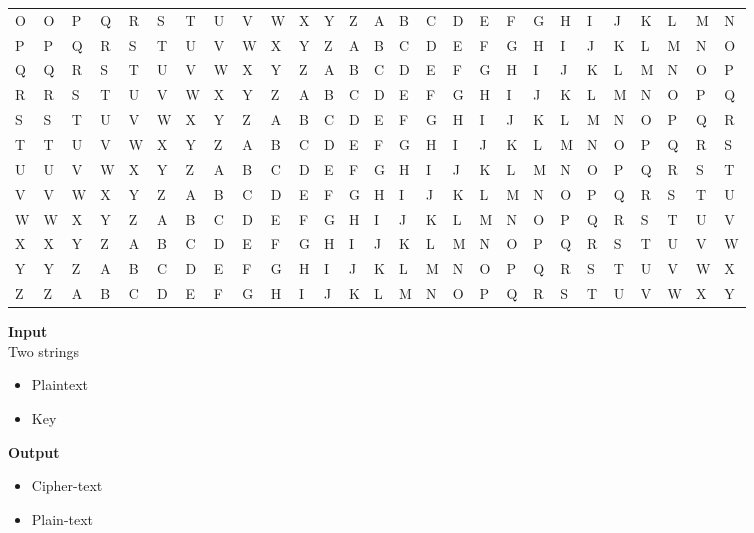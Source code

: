 \documentclass{article}
\begin{document}
\begin{table}[ht]
\begin{adjustbox}{width=1\textwidth}
\begin{tabular}{|l|llllllllllllllllllllllllll|}
O & O & P & Q & R                      & S & T & U & V & W & X & Y & Z & A & B & C & D & E & F & G & H & I & J & K & L & M & N  \\
P & P & Q & R & S                      & T & U & V & W & X & Y & Z & A & B & C & D & E & F & G & H & I & J & K & L & M & N & O  \\
Q & Q & R & S & T                      & U & V & W & X & Y & Z & A & B & C & D & E & F & G & H & I & J & K & L & M & N & O & P  \\
R & R & S & T & U                      & V & W & X & Y & Z & A & B & C & D & E & F & G & H & I & J & K & L & M & N & O & P & Q  \\
S & S & T & U & V                      & W & X & Y & Z & A & B & C & D & E & F & G & H & I & J & K & L & M & N & O & P & Q & R  \\
T & T & U & V & W                      & X & Y & Z & A & B & C & D & E & F & G & H & I & J & K & L & M & N & O & P & Q & R & S  \\
U & U & V & W & X                      & Y & Z & A & B & C & D & E & F & G & H & I & J & K & L & M & N & O & P & Q & R & S & T  \\
V & V & W & X & Y                      & Z & A & B & C & D & E & F & G & H & I & J & K & L & M & N & O & P & Q & R & S & T & U  \\
W & W & X & Y & Z                      & A & B & C & D & E & F & G & H & I & J & K & L & M & N & O & P & Q & R & S & T & U & V  \\
X & X & Y & Z & A                      & B & C & D & E & F & G & H & I & J & K & L & M & N & O & P & Q & R & S & T & U & V & W  \\
Y & Y & Z & A & B                      & C & D & E & F & G & H & I & J & K & L & M & N & O & P & Q & R & S & T & U & V & W & X  \\
Z & Z & A & B & C                      & D & E & F & G & H & I & J & K & L & M & N & O & P & Q & R & S & T & U & V & W & X & Y  \\
\hline
\end{tabular}
\end{adjustbox}
\end{table}

			
		\textbf{Input} \\
				Two strings \\
				\begin{itemize}
			\item  Plaintext 
			\item  Key
		\end{itemize}	
		\textbf{Output} \\
				\begin{itemize}
			\item Cipher-text
			\item  Plain-text
		\end{itemize}	
		
\end{document}
